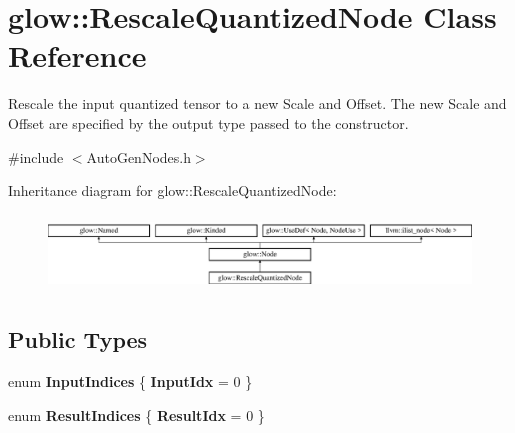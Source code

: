 \hypertarget{classglow_1_1_rescale_quantized_node}{}\section{glow\+:\+:Rescale\+Quantized\+Node Class Reference}
\label{classglow_1_1_rescale_quantized_node}


Rescale the input quantized tensor to a new Scale and Offset. The new Scale and Offset are specified by the output type passed to the constructor.  




{\ttfamily \#include $<$Auto\+Gen\+Nodes.\+h$>$}

Inheritance diagram for glow\+:\+:Rescale\+Quantized\+Node\+:\begin{figure}[H]
\begin{center}
\leavevmode
\includegraphics[height=2.028986cm]{classglow_1_1_rescale_quantized_node}
\end{center}
\end{figure}
\subsection*{Public Types}
\begin{DoxyCompactItemize}
\item 
\mbox{\label{classglow_1_1_rescale_quantized_node_a1c0c45cd33ad45258e2064ba62aa95ae}} 
enum {\bfseries Input\+Indices} \{ {\bfseries Input\+Idx} = 0
 \}
\item 
\mbox{\label{classglow_1_1_rescale_quantized_node_aaea0b91ffeef79532bfe6e6245efabab}} 
enum {\bfseries Result\+Indices} \{ {\bfseries Result\+Idx} = 0
 \}
\end{DoxyCompactItemize}
